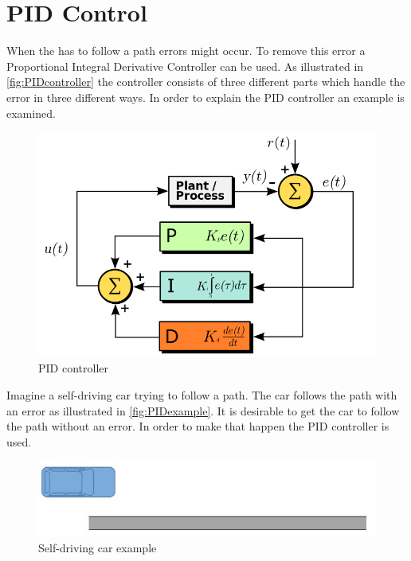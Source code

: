 \section{PID Control} %
\label{sec:pid_control}

When the has to follow a path errors might occur. To remove this error a Proportional Integral Derivative Controller can be used. As illustrated in \autoref{fig:PIDcontroller} the controller consists of three different parts which handle the error in three different ways. In order to explain the PID controller an example is examined. \\

\begin{figure}[h]
\centering
\includegraphics[scale=0.35]{images/PIDController}
\caption{PID controller}
\label{fig:PIDcontroller}
\end{figure}

Imagine a self-driving car trying to follow a path. The car follows the path with an error as illustrated in \autoref{fig:PIDexample}. It is desirable to get the car to follow the path without an error. In order to make that happen the PID controller is used.

\begin{figure}[h]
\centering
\includegraphics[scale=0.7]{images/PIDexample}
\caption{Self-driving car example}
\label{fig:PIDexample}
\end{figure}

